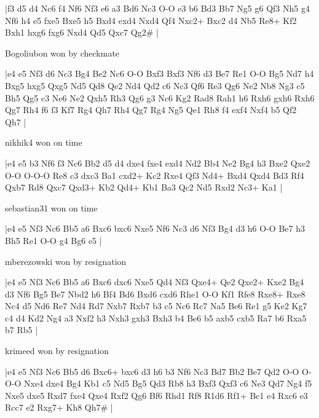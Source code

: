 \makegametitle
|f3 d5 d4 Nc6 f4 Nf6 Nf3 e6 a3 Bd6 Nc3 O-O e3 b6 Bd3 Bb7 Ng5 g6 Qf3 Nh5 g4 Nf6 h4 e5 fxe5 Bxe5 h5 Bxd4 exd4 Nxd4 Qf4 Nxc2+ Bxc2 d4 Nb5 Re8+ Kf2 Bxh1 hxg6 fxg6 Nxd4 Qd5 Qxc7 Qg2\#  |

\showboard

Bogoliubon won by checkmate

\makegametitle
|e4 e5 Nf3 d6 Nc3 Bg4 Be2 Nc6 O-O Bxf3 Bxf3 Nf6 d3 Be7 Re1 O-O Bg5 Nd7 h4 Bxg5 hxg5 Qxg5 Nd5 Qd8 Qe2 Nd4 Qd2 c6 Nc3 Qf6 Re3 Qg6 Ne2 Nb8 Ng3 c5 Bh5 Qg5 c3 Ne6 Ne2 Qxh5 Rh3 Qg6 g3 Nc6 Kg2 Rad8 Rah1 h6 Rxh6 gxh6 Rxh6 Qg7 Rh4 f6 f3 Kf7 Rg4 Qh7 Rh4 Qg7 Rg4 Ng5 Qe1 Rh8 f4 exf4 Nxf4 b5 Qf2 Qh7  |

\showboard

nikhik4 won on time

\makegametitle
|e4 e5 b3 Nf6 f3 Nc6 Bb2 d5 d4 dxe4 fxe4 exd4 Nd2 Bb4 Ne2 Bg4 h3 Bxe2 Qxe2 O-O O-O-O Re8 c3 dxc3 Ba1 cxd2+ Kc2 Rxe4 Qf3 Nd4+ Bxd4 Qxd4 Bd3 Rf4 Qxb7 Rd8 Qxc7 Qxd3+ Kb2 Qd4+ Kb1 Ba3 Qc2 Nd5 Rxd2 Nc3+ Ka1  |

\showboard

sebastian31 won on time

\makegametitle
|e4 e5 Nf3 Nc6 Bb5 a6 Bxc6 bxc6 Nxe5 Nf6 Nc3 d6 Nf3 Bg4 d3 h6 O-O Be7 h3 Bh5 Re1 O-O g4 Bg6 e5  |

\showboard

mberezowski won by resignation

\makegametitle
|e4 e5 Nf3 Nc6 Bb5 a6 Bxc6 dxc6 Nxe5 Qd4 Nf3 Qxe4+ Qe2 Qxe2+ Kxe2 Bg4 d3 Nf6 Bg5 Be7 Nbd2 h6 Bf4 Bd6 Bxd6 cxd6 Rhe1 O-O Kf1 Rfe8 Rxe8+ Rxe8 Nc4 d5 Nd6 Re7 Nd4 Rd7 Nxb7 Rxb7 b3 c5 Nc6 Rc7 Na5 Be6 Re1 g5 Ke2 Kg7 c4 d4 Kd2 Ng4 a3 Nxf2 h3 Nxh3 gxh3 Bxh3 b4 Be6 b5 axb5 cxb5 Ra7 b6 Rxa5 b7 Rb5  |

\showboard

krimeed won by resignation

\makegametitle
|e4 e5 Nf3 Nc6 Bb5 d6 Bxc6+ bxc6 d3 h6 b3 Nf6 Nc3 Bd7 Bb2 Be7 Qd2 O-O O-O-O Nxe4 dxe4 Bg4 Kb1 c5 Nd5 Bg5 Qd3 Rb8 h3 Bxf3 Qxf3 c6 Ne3 Qd7 Ng4 f5 Nxe5 dxe5 Rxd7 fxe4 Qxe4 Rxf2 Qg6 Bf6 Rhd1 Rf8 R1d6 Rf1+ Bc1 e4 Rxc6 e3 Rcc7 e2 Rxg7+ Kh8 Qh7\#  |


